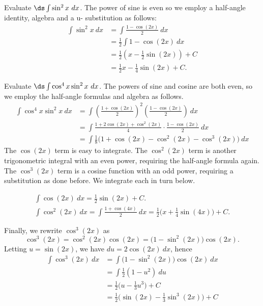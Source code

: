 
\begin{example}\label{ex_sub8}
Evaluate $\ds \int \sin^2x\ dx$.
\solution
The power of sine is even so we employ a half-angle identity, algebra and a u- substitution as follows:
\begin{align*}
	\int \sin^2x\ dx
	&= \int \frac{1-\cos(2x)}2\ dx \\
	&= \frac12\int 1-\cos(2x)\ dx \\
	&= \frac12\left(x - \frac12\sin(2x)\right)+C \\
	&= \frac12x - \frac14\sin(2x) + C.
\end{align*}
\end{example}

\begin{example}\label{ex_trigint3}
Evaluate $\ds\int\cos^4x\sin^2x\ dx$.
\solution
The powers of sine and cosine are both even, so we employ the half-angle formulas and algebra as follows.
\begin{align*}
	\int \cos^4x\sin^2x\ dx
	&= \int\left(\frac{1+\cos(2x)}{2}\right)^2\left(\frac{1-\cos(2x)}2\right)\ dx \\
	&= \int\frac{1+2\cos(2x)+\cos^2(2x)}4\cdot\frac{1-\cos(2x)}2\ dx\\
	&=	\int \frac18\big(1+\cos(2x)-\cos^2(2x)-\cos^3(2x)\big)\ dx
\end{align*}
The $\cos(2x)$ term is easy to integrate.
The $\cos^2(2x)$ term is another trigonometric integral with an even power, requiring the half-angle formula again. The $\cos^3(2x)$ term is a cosine function with an odd power, requiring a substitution as done before. We integrate each in turn below.

\begin{gather*}
\int\cos(2x)\ dx = \frac12\sin(2x)+C.\\
\int\cos^2(2x)\ dx = \int \frac{1+\cos(4x)}2\ dx
= \frac12\big(x+\frac14\sin(4x)\big)+C.
\end{gather*}

Finally, we rewrite $\cos^3(2x)$ as
\[\cos^3(2x) = \cos^2(2x)\cos(2x) = \big(1-\sin^2(2x)\big)\cos(2x).\]
Letting $u=\sin(2x)$, we have $du = 2\cos(2x)\ dx$, hence
\begin{align*}
\int \cos^3(2x)\ dx &= \int\big(1-\sin^2(2x)\big)\cos(2x)\ dx\\
							&= \int \frac12(1-u^2)\ du\\
							&= \frac12\Big(u-\frac13u^3\Big)+C\\
							&=	\frac12\Big(\sin(2x)-\frac13\sin^3(2x)\Big)+C
\end{align*}


\end{example}
